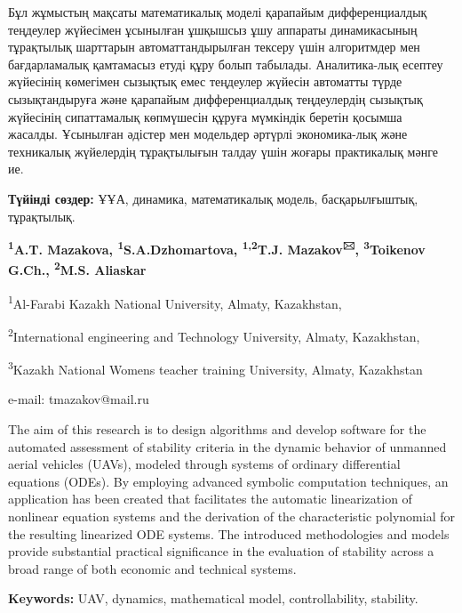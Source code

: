 Бұл жұмыстың мақсаты математикалық моделі қарапайым дифференциалдық
теңдеулер жүйесімен ұсынылған ұшқышсыз ұшу аппараты динамикасының
тұрақтылық шарттарын автоматтандырылған тексеру үшін алгоритмдер мен
бағдарламалық қамтамасыз етуді құру болып табылады. Аналитика-лық есептеу
жүйесінің көмегімен сызықтық емес теңдеулер жүйесін автоматты түрде
сызықтандыруға және қарапайым дифференциалдық теңдеулердің сызықтық
жүйесінің сипаттамалық көпмүшесін құруға мүмкіндік беретін қосымша
жасалды. Ұсынылған әдістер мен модельдер әртүрлі экономика-лық және
техникалық жүйелердің тұрақтылығын талдау үшін жоғары практикалық мәнге
ие.

{\bfseries Түйінді сөздер:} ҰҰА, динамика, математикалық модель,
басқарылғыштық, тұрақтылық.



\begin{center}
{\bfseries \textsuperscript{1}A.T. Mazakova,
\textsuperscript{1}S.A.Dzhomartova, \textsuperscript{1,2}T.J.
Mazakov\textsuperscript{🖂}, \textsuperscript{3}Toikenov G.Ch., \textsuperscript{2}M.S. Aliaskar}

\textsuperscript{1}Al-Farabi Kazakh National University, Almaty,
Kazakhstan,

\textsuperscript{2}International engineering and Technology University,
Almaty, Kazakhstan,

\textsuperscript{3}Kazakh National Women\textquotesingle s teacher
training University, Almaty, Kazakhstan

e-mail: tmazakov@mail.ru
\end{center}

The aim of this research is to design algorithms and develop software
for the automated assessment of stability criteria in the dynamic
behavior of unmanned aerial vehicles (UAVs), modeled through systems of
ordinary differential equations (ODEs). By employing advanced symbolic
computation techniques, an application has been created that facilitates
the automatic linearization of nonlinear equation systems and the
derivation of the characteristic polynomial for the resulting linearized
ODE systems. The introduced methodologies and models provide substantial
practical significance in the evaluation of stability across a broad
range of both economic and technical systems.

{\bfseries Keywords:} UAV, dynamics, mathematical model, controllability,
stability.


